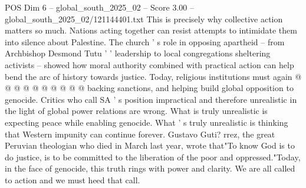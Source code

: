 \begin{textsample}{POS Dim 6 – global\_south\_2025\_02 – Score 3.00 – global\_south\_2025\_02/121144401.txt}
This is precisely why collective action matters so much.
Nations acting together can resist attempts to intimidate them into silence about Palestine.
The church ' s role in opposing apartheid -- from Archbishop Desmond Tutu ' ' leadership to local congregations sheltering activists -- showed how moral authority combined with practical action can help bend the arc of history towards justice.
Today, religious institutions must again @ @ @ @ @ @ @ @ @ @ backing sanctions, and helping build global opposition to genocide.
Critics who call SA ' s position impractical and therefore unrealistic in the light of global power relations are wrong.
What is truly unrealistic is expecting peace while enabling genocide.
What ' s truly unrealistic is thinking that Western impunity can continue forever.
Gustavo Guti? rrez, the great Peruvian theologian who died in March last year, wrote that"To know God is to do justice, is to be committed to the liberation of the poor and oppressed."Today, in the face of genocide, this truth rings with power and clarity.
We are all called to action and we must heed that call.

\end{textsample}
